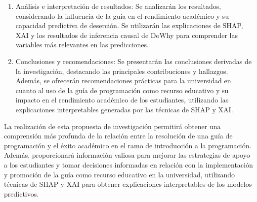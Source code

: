 \begin{enumerate}
    \item Análisis e interpretación de resultados: Se analizarán los resultados, considerando la influencia de la guía en el rendimiento académico y su capacidad predictiva de deserción. Se utilizarán las explicaciones de SHAP, XAI y los resultados de inferencia causal de DoWhy para comprender las variables más relevantes en las predicciones.

    \item Conclusiones y recomendaciones: Se presentarán las conclusiones derivadas de la investigación, destacando las principales contribuciones y hallazgos. Además, se ofrecerán recomendaciones prácticas para la universidad en cuanto al uso de la guía de programación como recurso educativo y su impacto en el rendimiento académico de los estudiantes, utilizando las explicaciones interpretables generadas por las técnicas de SHAP y XAI.

\end{enumerate}

La realización de esta propuesta de investigación permitirá obtener una comprensión más profunda de la relación entre la resolución de una guía de programación y el éxito académico en el ramo de introducción a la programación. Además, proporcionará información valiosa para mejorar las estrategias de apoyo a los estudiantes y tomar decisiones informadas en relación con la implementación y promoción de la guía como recurso educativo en la universidad, utilizando técnicas de SHAP y XAI para obtener explicaciones interpretables de los modelos predictivos.

